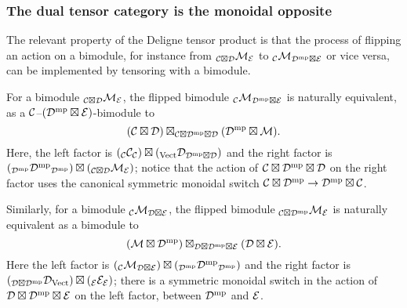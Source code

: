 \documentclass{amsart}
\begin{document}
\subsubsection{The dual tensor category is the monoidal opposite}

The relevant property of the Deligne tensor product is that the process of flipping an action on a bimodule, for instance from ${}_{\mathcal C \boxtimes \mathcal D} \mathcal M_\mathcal E$ to ${}_\mathcal C \mathcal M_{\mathcal D^{\mathrm{mp}} \boxtimes \mathcal E}$ or vice versa, can be implemented by tensoring with a bimodule.
\begin{lemma} \label{lemma:flip}
For a bimodule ${}_{\mathcal C \boxtimes \mathcal D} \mathcal M_\mathcal E$, the flipped bimodule ${}_\mathcal C \mathcal M_{\mathcal D^{\mathrm{mp}} \boxtimes \mathcal E}$ is naturally equivalent, as a $\mathcal C$--$(\mathcal D^{\mathrm{mp}} \boxtimes \mathcal E)$-bimodule to
\[
(\mathcal C \boxtimes \mathcal D) \boxtimes_{\mathcal C \boxtimes \mathcal D^{\mathrm{mp}} \boxtimes \mathcal D} (\mathcal D^{\mathrm{mp}} \boxtimes \mathcal M).
\]
Here, the left factor is $({}_\mathcal C \mathcal C_\mathcal C) \boxtimes ({}_{\mathrm{Vect}} \mathcal D_{\mathcal D^{\mathrm{mp}} \boxtimes \mathcal D})$ and the right factor is $({}_{\mathcal D^{\mathrm{mp}}} {\mathcal D^{\mathrm{mp}}}_{\mathcal D^{\mathrm{mp}}}) \boxtimes ({}_{\mathcal C \boxtimes \mathcal D} \mathcal M_\mathcal E)$; notice that the action of $\mathcal C \boxtimes \mathcal D^{\mathrm{mp}} \boxtimes \mathcal D$ on the right factor uses the canonical symmetric monoidal switch $\mathcal C \boxtimes \mathcal D^{\mathrm{mp}} \rightarrow \mathcal D^{\mathrm{mp}} \boxtimes \mathcal C$.

Similarly, for a bimodule ${}_\mathcal C \mathcal M_{\mathcal D \boxtimes \mathcal E}$, the flipped bimodule ${}_{\mathcal C \boxtimes \mathcal D^{\mathrm{mp}}} \mathcal M_\mathcal E$ is naturally equivalent as a bimodule to
\[
(\mathcal M \boxtimes \mathcal D^{\mathrm{mp}}) \boxtimes_{\mathcal D \boxtimes \mathcal D^{\mathrm{mp}} \boxtimes \mathcal E} (\mathcal D \boxtimes \mathcal E).
\]
Here the left factor is $({}_\mathcal C \mathcal M_{\mathcal D \boxtimes \mathcal E}) \boxtimes ({}_{\mathcal D^{\mathrm{mp}}} {\mathcal D^{\mathrm{mp}}}_{\mathcal D^{\mathrm{mp}}})$ and the right factor is $({}_{\mathcal D \boxtimes \mathcal D^{\mathrm{mp}}} \mathcal D_{\mathrm{Vect}}) \boxtimes ({}_\mathcal E \mathcal E_\mathcal E)$; there is a symmetric monoidal switch in the action of $\mathcal D \boxtimes \mathcal D^{\mathrm{mp}} \boxtimes \mathcal E$ on the left factor, between $\mathcal D^{\mathrm{mp}}$ and $\mathcal E$.
\end{lemma}
\end{document}
